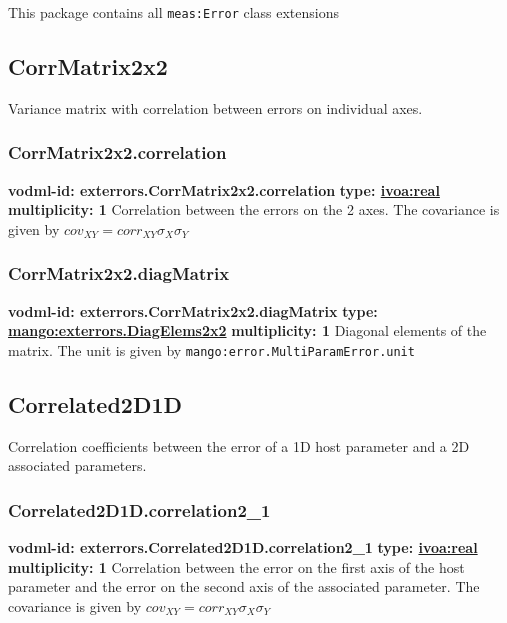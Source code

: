 
  This package contains all \texttt{meas:Error} class extensions

  \subsection{CorrMatrix2x2}
  \label{sect:exterrors.CorrMatrix2x2}
    Variance matrix with correlation between errors on individual axes.

    \subsubsection{CorrMatrix2x2.correlation}
      \textbf{vodml-id: exterrors.CorrMatrix2x2.correlation} \newline
      \textbf{type: \hyperref[sect:ivoa]{ivoa:real}} \newline
      \textbf{multiplicity: 1} \newline 
      Correlation between the errors on the 2 axes. The covariance is given by $cov_{XY}=corr_{XY}\sigma_{X}\sigma_{Y}$

    \subsubsection{CorrMatrix2x2.diagMatrix}
      \textbf{vodml-id: exterrors.CorrMatrix2x2.diagMatrix} \newline
      \textbf{type: \hyperref[sect:exterrors.DiagElems2x2]{mango:exterrors.DiagElems2x2}} \newline
      \textbf{multiplicity: 1} \newline 
      Diagonal elements of the matrix. The unit is given by \texttt{mango:error.MultiParamError.unit}

  \subsection{Correlated2D1D}
  \label{sect:exterrors.Correlated2D1D}
    Correlation coefficients between the error of a 1D host parameter and a 2D associated parameters.

    \subsubsection{Correlated2D1D.correlation2\_1}
      \textbf{vodml-id: exterrors.Correlated2D1D.correlation2\_1} \newline
      \textbf{type: \hyperref[sect:ivoa]{ivoa:real}} \newline
      \textbf{multiplicity: 1} \newline 
      Correlation between the error on the first axis of the host parameter and the error on the second axis of the associated parameter. The covariance is given by $cov_{XY}=corr_{XY}\sigma_{X}\sigma_{Y}$

